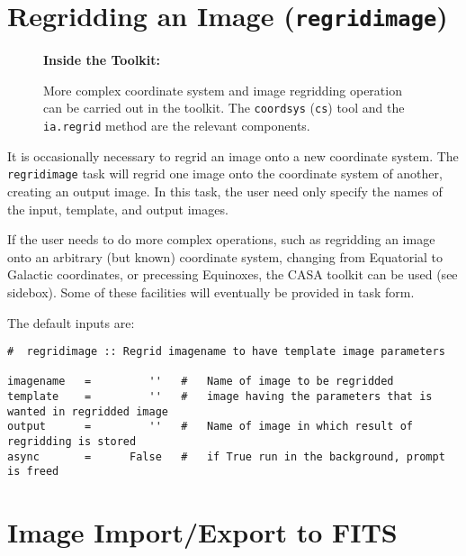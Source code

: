 \section{Regridding an Image ({\tt regridimage})}
\label{section:analysis.regrid}

\begin{wrapfigure}{r}{2.5in}
  \begin{boxedminipage}{2.5in}
     \centerline{\bf Inside the Toolkit:}
     More complex coordinate system and image regridding 
     operation can be carried out in the toolkit.  The 
     {\tt coordsys} ({\tt cs}) tool and the {\tt ia.regrid}
     method are the relevant components.
  \end{boxedminipage}
\end{wrapfigure}

It is occasionally necessary to regrid an image onto a new coordinate
system.  The {\tt regridimage} task will regrid one image onto the
coordinate system of another, creating an output image.  In this
task, the user need only specify the names of the input, template, and
output images.  

If the user needs to do more complex operations, such as regridding an
image onto an arbitrary (but known) coordinate system, changing from
Equatorial to Galactic coordinates, or precessing Equinoxes, the CASA
toolkit can be used (see sidebox).  Some of these facilities will
eventually be provided in task form.

The default inputs are:
\small
\begin{verbatim}
#  regridimage :: Regrid imagename to have template image parameters

imagename   =         ''   #   Name of image to be regridded
template    =         ''   #   image having the parameters that is wanted in regridded image
output      =         ''   #   Name of image in which result of regridding is stored
async       =      False   #   if True run in the background, prompt is freed
\end{verbatim}
\normalsize

\section{Image Import/Export to FITS}
\label{section:analysis.fits}

